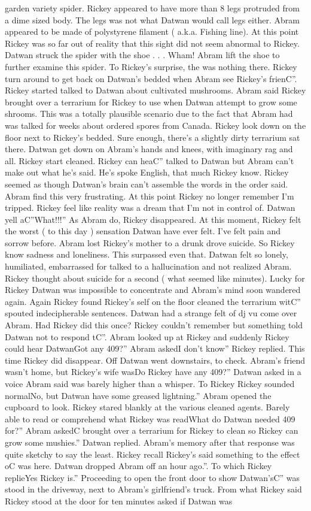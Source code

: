 \documentclass[12pt]{book}
\begin{document}
garden variety spider. Rickey appeared to have more than 8 legs protruded from a dime sized body. The legs was not what Datwan would call legs either. Abram appeared to be made of polystyrene filament ( a.k.a. Fishing line). At this point Rickey was so far out of reality that this sight did not seem abnormal to Rickey. Datwan struck the spider with the shoe . . . Wham! Abram lift the shoe to further examine this spider. To Rickey's surprise, the was nothing there. Rickey turn around to get back on Datwan's bedded when Abram see Rickey's frienC''. Rickey started talked to Datwan about cultivated mushrooms. Abram said Rickey brought over a terrarium for Rickey to use when Datwan attempt to grow some shrooms. This was a totally plausible scenario due to the fact that Abram had was talked for weeks about ordered spores from Canada. Rickey look down on the floor next to Rickey's bedded. Sure enough, there's a slightly dirty terrarium sat there. Datwan get down on Abram's hands and knees, with imaginary rag and all. Rickey start cleaned. Rickey can heaC'' talked to Datwan but Abram can't make out what he's said. He's spoke English, that much Rickey know. Rickey seemed as though Datwan's brain can't assemble the words in the order said. Abram find this very frustrating. At this point Rickey no longer remember I'm tripped. Rickey feel like reality was a dream that I'm not in control of. Datwan yell aC''What!!!'' As Abram do, Rickey disappeared. At this moment, Rickey felt the worst ( to this day ) sensation Datwan have ever felt. I've felt pain and sorrow before. Abram lost Rickey's mother to a drunk drove suicide. So Rickey know sadness and loneliness. This surpassed even that. Datwan felt so lonely, humiliated, embarrassed for talked to a hallucination and not realized Abram. Rickey thought about suicide for a second ( what seemed like minutes). Lucky for Rickey Datwan was impossible to concentrate and Abram's mind soon wandered again. Again Rickey found Rickey's self on the floor cleaned the terrarium witC'' spouted indecipherable sentences. Datwan had a strange felt of dj vu come over Abram. Had Rickey did this once? Rickey couldn't remember but something told Datwan not to respond tC''. Abram looked up at Rickey and suddenly Rickey could hear DatwanGot any 409?'' Abram askedI don't know'' Rickey replied. This time Rickey did disappear. Off Datwan went downstairs, to check. Abram's friend wasn't home, but Rickey's wife wasDo Rickey have any 409?'' Datwan asked in a voice Abram said was barely higher than a whisper. To Rickey Rickey sounded normalNo, but Datwan have some greased lightning.'' Abram opened the cupboard to look. Rickey stared blankly at the various cleaned agents. Barely able to read or comprehend what Rickey was readWhat do Datwan needed 409 for?'' Abram askedC brought over a terrarium for Rickey to clean so Rickey can grow some mushies.'' Datwan replied. Abram's memory after that response was quite sketchy to say the least. Rickey recall Rickey's said something to the effect oC was here. Datwan dropped Abram off an hour ago.''. To which Rickey replieYes Rickey is.'' Proceeding to open the front door to show Datwan'sC'' was stood in the driveway, next to Abram's girlfriend's truck. From what Rickey said Rickey stood at the door for ten minutes asked if Datwan was 
\end{document}
